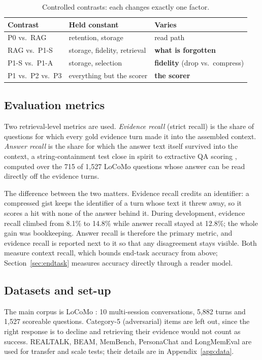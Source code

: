 \begin{table}[htbp]
\caption{Controlled contrasts: each changes exactly one factor.}
\label{tab:contrasts}
\centering
\fontsize{10}{12}\selectfont
\begin{tabular}{@{}lll@{}}
\toprule
Contrast & Held constant & Varies \\
\midrule
P0 vs.\ RAG   & retention, storage & read path \\
RAG vs.\ P1-S & storage, fidelity, retrieval & \textbf{what is forgotten} \\
P1-S vs.\ P1-A& storage, selection & \textbf{fidelity} (drop vs.\ compress) \\
P1 vs.\ P2 vs.\ P3 & everything but the scorer & \textbf{the scorer} \\
\bottomrule
\end{tabular}
\end{table}

\subsection{Evaluation metrics}
\label{sec:metrics}
Two retrieval-level metrics are used. \emph{Evidence recall} (strict recall)
is the share of questions for which every gold evidence turn made it into the
assembled context. \emph{Answer recall} is the share for which the answer text
itself survived into the context, a string-containment test close in spirit to
extractive QA scoring \cite{rajpurkar2016squad}, computed over the 715 of
1{,}527 LoCoMo questions whose answer can be read directly off the evidence
turns.

The difference between the two matters. Evidence recall credits an
identifier: a compressed gist keeps the identifier of a turn whose text it
threw away, so it scores a hit with none of the answer behind it. During
development, evidence recall climbed from 8.1\% to 14.8\% while answer recall
stayed at 12.8\%; the whole gain was bookkeeping. Answer recall is therefore
the primary metric, and evidence recall is reported next to it so that any
disagreement stays visible. Both measure context recall, which bounds
end-task accuracy from above; Section~\ref{sec:endtask} measures accuracy
directly through a reader model.

\subsection{Datasets and set-up}
\label{sec:setup}
The main corpus is LoCoMo \cite{maharana2024locomo}: 10 multi-session
conversations, 5{,}882 turns and 1{,}527 scoreable questions. Category-5
(adversarial) items are left out, since the right response is to decline and
retrieving their evidence would not count as success. REALTALK, BEAM,
MemBench, PersonaChat and LongMemEval are used for transfer and scale tests;
their details are in Appendix~\ref{app:data}.

